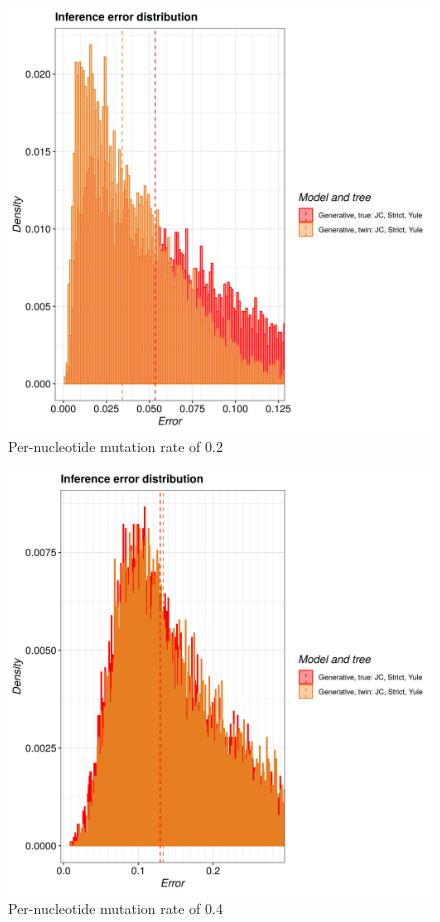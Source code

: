 \begin{figure}[H]
  \includegraphics[width=\textwidth]{pirouette_example_24/example_24_318/errors.png}
  \caption{Per-nucleotide mutation rate of 0.2}
\end{figure}

\begin{figure}[H]
  \includegraphics[width=\textwidth]{pirouette_example_24/example_24_319/errors.png}
  \caption{Per-nucleotide mutation rate of 0.4}
\end{figure}

